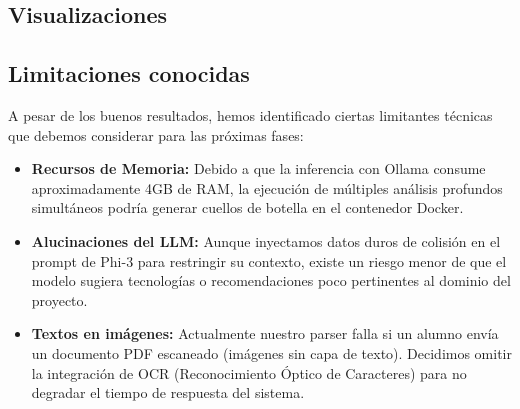 \subsection{Visualizaciones}


\subsection{Limitaciones conocidas}

A pesar de los buenos resultados, hemos identificado ciertas limitantes técnicas que debemos considerar para las próximas fases:

\begin{itemize}
  \item \textbf{Recursos de Memoria:} Debido a que la inferencia con Ollama consume aproximadamente 4GB de RAM, la ejecución de múltiples análisis profundos simultáneos podría generar cuellos de botella en el contenedor Docker.
  \item \textbf{Alucinaciones del LLM:} Aunque inyectamos datos duros de colisión en el prompt de Phi-3 para restringir su contexto, existe un riesgo menor de que el modelo sugiera tecnologías o recomendaciones poco pertinentes al dominio del proyecto.
  \item \textbf{Textos en imágenes:} Actualmente nuestro parser falla si un alumno envía un documento PDF escaneado (imágenes sin capa de texto). Decidimos omitir la integración de OCR (Reconocimiento Óptico de Caracteres) para no degradar el tiempo de respuesta del sistema.
\end{itemize}
